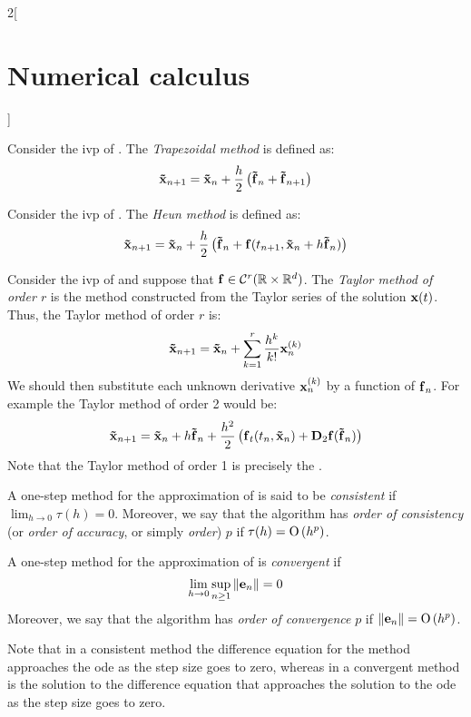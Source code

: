 \documentclass[../../../main_math.tex]{subfiles}
\begin{document}
\begin{multicols}{2}[\section{Numerical calculus}]
\begin{figure}[H]
    \label{NC:euler_fig}
  \end{figure}
  \begin{definition}
    Consider the ivp of . The \emph{Trapezoidal method} is defined as:
    $$\boldsymbol{\mathrm{\tilde{x}}}_{n+1}=\boldsymbol{\mathrm{\tilde{x}}}_{n}+\frac{h}{2}\left(\boldsymbol{\mathrm{\tilde{f}}}_n+\boldsymbol{\mathrm{\tilde{f}}}_{n+1}\right)$$
  \end{definition}
  \begin{definition}
    Consider the ivp of . The \emph{Heun method} is defined as:
    $$\boldsymbol{\mathrm{\tilde{x}}}_{n+1}=\boldsymbol{\mathrm{\tilde{x}}}_{n}+\frac{h}{2}\left(\boldsymbol{\mathrm{\tilde{f}}}_n+\boldsymbol{\mathrm{f}}(t_{n+1},\boldsymbol{\mathrm{\tilde{x}}}_{n}+h\boldsymbol{\mathrm{\tilde{f}}}_n)\right)$$
  \end{definition}
  \begin{definition}
    Consider the ivp of  and suppose that $\boldsymbol{\mathrm{f}}\in\mathcal{C}^r(\mathbb{R}\times\mathbb{R}^d)$. The \emph{Taylor method of order $r$} is the method constructed from the Taylor series of the solution $\boldsymbol{\mathrm{x}}(t)$. Thus, the Taylor method of order $r$ is:
    $$\boldsymbol{\mathrm{\tilde{x}}}_{n+1}=\boldsymbol{\mathrm{\tilde{x}}}_{n}+\sum_{k=1}^r\frac{h^k}{k!}\boldsymbol{\mathrm{x}}_n^{(k)}$$
    We should then substitute each unknown derivative $\boldsymbol{\mathrm{x}}_n^{(k)}$ by a function of $\boldsymbol{\mathrm{f}}_n$.
    For example the Taylor method of order 2 would be:
    $$\boldsymbol{\mathrm{\tilde{x}}}_{n+1}=\boldsymbol{\mathrm{\tilde{x}}}_{n}+h\boldsymbol{\mathrm{\tilde{f}}}_n+\frac{h^2}{2}\left(\boldsymbol{\mathrm{{f}}}_t(t_n,\boldsymbol{\mathrm{\tilde{x}}}_{n})+\boldsymbol{\mathrm{D}}_2\boldsymbol{\mathrm{f}}(\boldsymbol{\mathrm{\tilde{f}}}_n)\right)$$
    Note that the Taylor method of order 1 is precisely the .
  \end{definition}
  \begin{definition}
    A one-step method for the approximation of  is said to be \emph{consistent} if $\displaystyle\lim_{h\to 0}\tau(h)=0$. Moreover, we say that the algorithm has \emph{order of consistency} (or \emph{order of accuracy}, or simply \emph{order}) $p$ if $\tau(h)=\mathrm{O}\left(h^p\right)$.
  \end{definition}
  \begin{definition}
    A one-step method for the approximation of  is \emph{convergent} if $$\lim_{h\to 0}\sup_{n\geq 1}\left\|\boldsymbol{\mathrm{e}}_n\right\|=0$$
    Moreover, we say that the algorithm has \emph{order of convergence} $p$ if $\left\|\boldsymbol{\mathrm{e}}_n\right\|=\mathrm{O}\left(h^p\right)$.
  \end{definition}
  \begin{remark}
    Note that in a consistent method the difference equation for the method approaches the ode as the step size goes to zero, whereas in a convergent method is the solution to the difference equation that approaches the solution to the ode as the step size goes to zero.

\end{remark}
\end{multicols}
\end{document}
